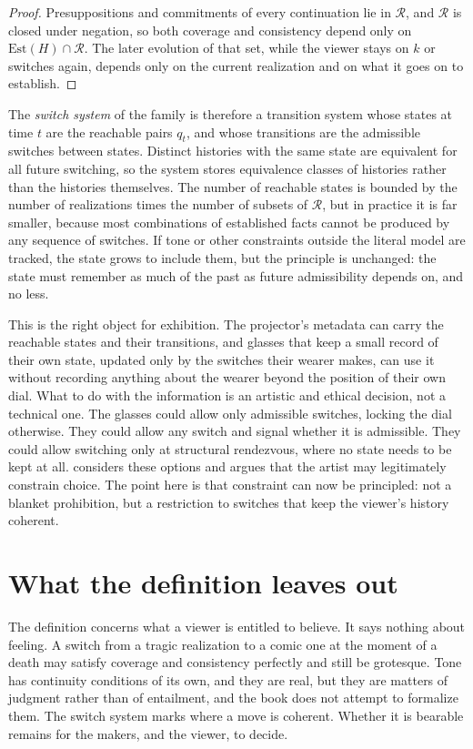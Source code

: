 \begin{proof}
Presuppositions and commitments of every continuation lie in $\mathcal R$, and $\mathcal R$ is closed under negation, so both coverage and consistency depend only on $\mathrm{Est}(H)\cap\mathcal R$. The later evolution of that set, while the viewer stays on $k$ or switches again, depends only on the current realization and on what it goes on to establish.
\end{proof}

The \emph{switch system} of the family is therefore a transition system whose states at time $t$ are the reachable pairs $q_t$, and whose transitions are the admissible switches between states. Distinct histories with the same state are equivalent for all future switching, so the system stores equivalence classes of histories rather than the histories themselves. The number of reachable states is bounded by the number of realizations times the number of subsets of $\mathcal R$, but in practice it is far smaller, because most combinations of established facts cannot be produced by any sequence of switches. If tone or other constraints outside the literal model are tracked, the state grows to include them, but the principle is unchanged: the state must remember as much of the past as future admissibility depends on, and no less.

This is the right object for exhibition. The projector's metadata can carry the reachable states and their transitions, and glasses that keep a small record of their own state, updated only by the switches their wearer makes, can use it without recording anything about the wearer beyond the position of their own dial. What to do with the information is an artistic and ethical decision, not a technical one. The glasses could allow only admissible switches, locking the dial otherwise. They could allow any switch and signal whether it is admissible. They could allow switching only at structural rendezvous, where no state needs to be kept at all.  considers these options and argues that the artist may legitimately constrain choice. The point here is that constraint can now be principled: not a blanket prohibition, but a restriction to switches that keep the viewer's history coherent.

\section{What the definition leaves out}

The definition concerns what a viewer is entitled to believe. It says nothing about feeling. A switch from a tragic realization to a comic one at the moment of a death may satisfy coverage and consistency perfectly and still be grotesque. Tone has continuity conditions of its own, and they are real, but they are matters of judgment rather than of entailment, and the book does not attempt to formalize them. The switch system marks where a move is coherent. Whether it is bearable remains for the makers, and the viewer, to decide.

